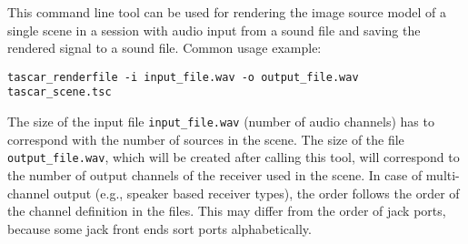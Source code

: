 This command line tool can be used for rendering the image source model of a single scene in a
\tascar{} session with audio input from a sound file and saving the rendered signal to a sound file.
Common usage example:
\begin{lstlisting}[numbers=none]
  tascar_renderfile -i input_file.wav -o output_file.wav tascar_scene.tsc
\end{lstlisting}

The size of the input file \verb!input_file.wav! (number of audio
channels) has to correspond with the number of sources in the
scene. The size of the file \verb!output_file.wav!, which will be
created after calling this tool, will correspond to the number of
output channels of the receiver used in the scene. In case of
multi-channel output (e.g., speaker based receiver types), the order
follows the order of the channel definition in the \tascar{}
files. This may differ from the order of jack ports, because some
jack front ends sort ports alphabetically.
